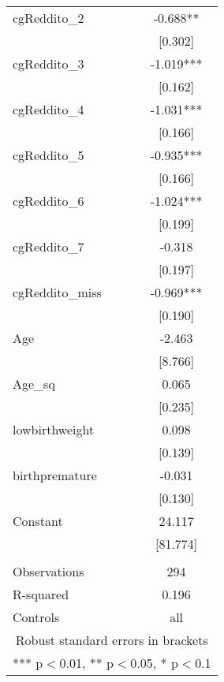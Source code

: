 \documentclass[]{article}
\begin{document}
\begin{tabular}{lc}
cgReddito\_2 & -0.688** \\
 & [0.302] \\
cgReddito\_3 & -1.019*** \\
 & [0.162] \\
cgReddito\_4 & -1.031*** \\
 & [0.166] \\
cgReddito\_5 & -0.935*** \\
 & [0.166] \\
cgReddito\_6 & -1.024*** \\
 & [0.199] \\
cgReddito\_7 & -0.318 \\
 & [0.197] \\
cgReddito\_miss & -0.969*** \\
 & [0.190] \\
Age & -2.463 \\
 & [8.766] \\
Age\_sq & 0.065 \\
 & [0.235] \\
lowbirthweight & 0.098 \\
 & [0.139] \\
birthpremature & -0.031 \\
 & [0.130] \\
Constant & 24.117 \\
 & [81.774] \\
 &  \\
Observations & 294 \\
R-squared & 0.196 \\
 Controls & all \\ \hline
\multicolumn{2}{c}{ Robust standard errors in brackets} \\
\multicolumn{2}{c}{ *** p$<$0.01, ** p$<$0.05, * p$<$0.1} \\
\end{tabular}
\end{document}
